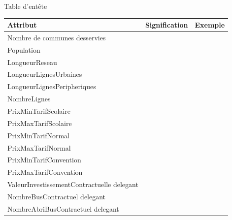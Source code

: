 \documentclass[a4paper]{report}
\begin{document}
\begin{doublespace}
\begin{table}[H]
\begin{center}
			\caption{Table d'entête}
		\end{center}
	\end{table}
	\begin{table}[H]
		\begin{center}
			\begin{tabularx}{17.5cm}{|X|p{3cm}|p{1.5cm}|}
				\hline
				\textbf{Attribut}                              & \textbf{Signification} & \textbf{Exemple} \\
				\hline
				Nombre de communes desservies                  &                        &                  \\
				\hline
				Population                                     &                        &                  \\
				\hline
				LongueurReseau                                 &                        &                  \\
				\hline
				LongueurLignesUrbaines                         &                        &                  \\
				\hline
				LongueurLignesPeripheriques                    &                        &                  \\
				\hline
				NombreLignes                                   &                        &                  \\
				\hline
				PrixMinTarifScolaire                           &                        &                  \\
				\hline
				PrixMaxTarifScolaire                           &                        &                  \\
				\hline
				PrixMinTarifNormal                             &                        &                  \\
				\hline
				PrixMaxTarifNormal                             &                        &                  \\
				\hline
				PrixMinTarifConvention                         &                        &                  \\
				\hline
				PrixMaxTarifConvention                         &                        &                  \\
				\hline
				ValeurInvestissementContractuelle delegant     &                        &                  \\
				\hline
				NombreBusContractuel delegant                  &                        &                  \\
				\hline
				NombreAbriBusContractuel delegant              &                        &                  \\

\end{tabularx}
\end{center}
\end{table}
\end{doublespace}
\end{document}
